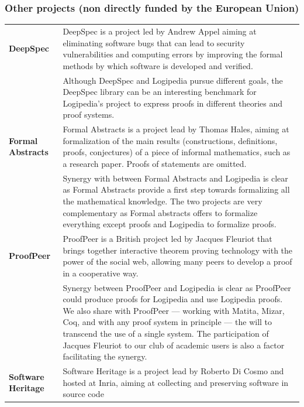 \subsubsection*{Other projects (non directly funded by the European Union)}

\begin{longtable}{|p{}|p{}|}
\hline
{\bf DeepSpec}
&
DeepSpec is a project led by Andrew Appel aiming at eliminating
software bugs that can lead to security vulnerabilities and computing
errors by improving the formal methods by which software is developed
and verified.
\\
&
\hspace{0.4cm}
Although DeepSpec and Logipedia pursue different goals, the DeepSpec
library can be an interesting benchmark for Logipedia's project to
express proofs in different theories and proof systems.
\\
\hline
{\bf Formal Abstracts} & 
Formal Abstracts is a project lead by Thomas Hales, aiming at
formalization of the main results (constructions, definitions, proofs,
conjectures) of a piece of informal mathematics, such as a research
paper.  Proofs of statements are omitted.
\\
&
\hspace{0.4cm} Synergy with between Formal Abstracts and Logipedia is
clear as Formal Abstracts provide a first step towards formalizing all
the mathematical knowledge. The two projects are very complementary as 
Formal abstracts offers to formalize everything except proofs and
Logipedia to formalize proofs.
\\
\hline
{\bf ProofPeer}
&
ProofPeer is a British project led by Jacques Fleuriot that 
brings together interactive theorem proving technology with
the power of the social web, allowing many peers to develop a proof 
in a cooperative way.\\
&
\hspace{0.4cm}
Synergy between ProofPeer and Logipedia is clear as ProofPeer
could produce proofs for Logipedia and use Logipedia proofs.  We also
share with ProofPeer --- working with Matita, Mizar, Coq, and with any
proof system in principle --- the will to transcend the use of a single
system. The participation of Jacques Fleuriot to our club of academic users 
is also a factor facilitating the synergy.\\
\hline
{\bf Software Heritage} & 
Software Heritage is a project lead by Roberto Di Cosmo and hosted at
Inria, aiming at collecting and preserving software in source code

\end{longtable}
